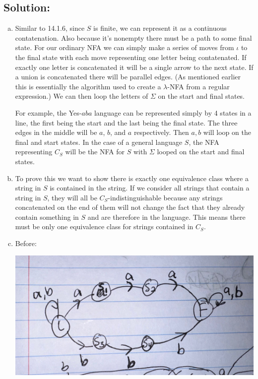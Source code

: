 \documentclass[12pt]{article}
\begin{document}
\subsection*{\textbf{Solution:}}
\begin{enumerate}[(a)]
    \item Similar to 14.1.6, since $S$ is finite, we can represent it as a continuous contatenation. Also because it's nonempty there must be a path to some final state. For our ordinary NFA we can simply make a series of moves from $\iota$ to the final state with each move representing one letter being contatenated. If exactly one letter is concatenated it will be a single arrow to the next state. If a union is concatenated there will be parallel edges. (As mentioned earlier this is essentially the algorithm used to create a $\lambda$-NFA from a regular expression.) We can then loop the letters of $\Sigma$ on the start and final states.

For example, the Yes-$aba$ language can be represented simply by 4 states in a line, the first being the start and the last being the final state. The three edges in the middle will be $a$, $b$, and $a$ respectively. Then $a,b$ will loop on the final and start states. In the case of a general language $S$, the NFA representing $C_S$ will be the NFA for $S$ with $\Sigma$ looped on the start and final states.

    \item To prove this we want to show there is exactly one equivalence class where a string in $S$ is contained in the string. If we consider all strings that contain a string in $S$, they will all be \mbox{$C_S$-indistinguishable} because any strings concatenated on the end of them will not change the fact that they already contain something in $S$ and are therefore in the language. This means there must be only one equivalence class for strings contained in $C_S$.

    \item Before:

\begin{center}
\includegraphics[scale=.1]{14.6.9.1}
\end{center}


\end{enumerate}
\end{document}
